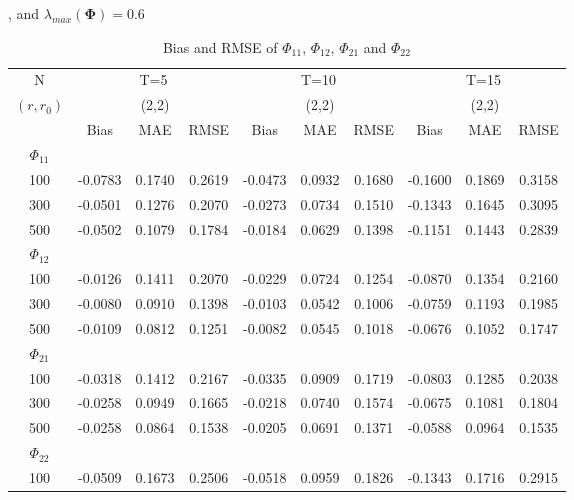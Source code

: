 \documentclass[12pt,a4paper,hyperref]{article}
\begin{document}
\begin{table}[H]
\caption{Bias and RMSE of $\Phi_{11}$, $\Phi_{12}$, $\Phi_{21}$ and $\Phi_{22}$} , and $\lambda_{max}(\boldsymbol{\Phi})=0.6$    \label{table1}
\centering
\tabcolsep=0.11cm
\begin{threeparttable}
\begin{tabular} {*{10}{c}}
\toprule
N& \multicolumn{3}{c}{T=5}&\multicolumn{3}{c}{T=10}&\multicolumn{3}{c}{T=15}\\
\cmidrule(lr){1-10}
$(r,r_{0})$ &   &(2,2)  &  &   &(2,2)  & &  &(2,2) & \\
\cmidrule(lr){1-4} \cmidrule(lr){5-7}\cmidrule(lr){8-10}
& \multicolumn{1}{c}{Bias} &\multicolumn{1}{c}{MAE}& \multicolumn{1}{c}{RMSE}&\multicolumn{1}{c}{Bias} &\multicolumn{1}{c}{MAE}& \multicolumn{1}{c}{RMSE}&\multicolumn{1}{c}{Bias}&\multicolumn{1}{c}{MAE} & \multicolumn{1}{c}{RMSE}\\
  \cmidrule(lr){2-4} \cmidrule(lr){5-7} \cmidrule(lr){8-10}
 $\Phi_{11}$\\
\cmidrule(lr){1-10}
100& -0.0783 &0.1740 &0.2619 &	-0.0473 &0.0932&0.1680 &-0.1600& 0.1869&0.3158\\
300&-0.0501 & 0.1276& 0.2070&-0.0273	  &0.0734	&0.1510	& -0.1343& 0.1645&  0.3095\\
500&-0.0502& 0.1079& 0.1784  &-0.0184  &	0.0629& 0.1398&-0.1151 & 0.1443&	0.2839  \\
\cmidrule(lr){1-10}
$\Phi_{12}$\\
\cmidrule(lr){1-4}   \cmidrule(lr){5-7}   \cmidrule(lr){8-10}
  100&-0.0126  &0.1411& 0.2070&	-0.0229 &0.0724	& 0.1254&-0.0870 &0.1354& 0.2160 \\
300& -0.0080 &0.0910& 0.1398&-0.0103	  &	0.0542&	0.1006& -0.0759&0.1193 & 0.1985\\
500& -0.0109& 0.0812 &0.1251 &-0.0082	  &0.0545	&0.1018 &-0.0676 &0.1052 &	0.1747  \\
\cmidrule(lr){1-10}
$\Phi_{21}$\\
\cmidrule(lr){1-4}   \cmidrule(lr){5-7}   \cmidrule(lr){8-10}
 100& -0.0318 & 0.1412&0.2167&-0.0335  &	0.0909&0.1719 &-0.0803&0.1285& 0.2038 \\
300&  -0.0258& 0.0949 &0.1665&-0.0218  &0.0740&0.1574& -0.0675& 0.1081& 0.1804\\
500&-0.0258& 0.0864 & 0.1538 &	-0.0205 &0.0691&0.1371 & -0.0588& 0.0964&	0.1535  \\
\cmidrule(lr){1-10}
$\Phi_{22}$\\
\cmidrule(lr){1-4}   \cmidrule(lr){5-7}   \cmidrule(lr){8-10}
 100& -0.0509&0.1673&0.2506&	-0.0518&	0.0959& 0.1826& -0.1343& 0.1716& 0.2915  \\

\end{tabular}
\end{threeparttable}
\end{table}
\end{document}
